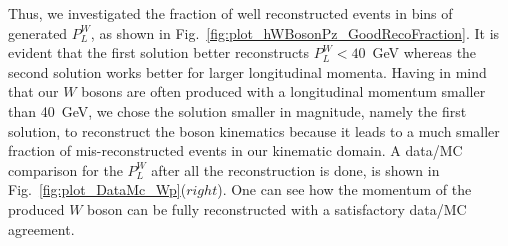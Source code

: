 \documentclass[12pt]{article}
\begin{document}
Thus, we investigated the fraction of well reconstructed events in bins of  generated $P^{W}_{L}$, as shown in Fig.~\ref{fig:plot_hWBosonPz_GoodRecoFraction}.
It is evident that the first solution better reconstructs  $P^{W}_{L}<40$~GeV whereas the second solution works better for larger longitudinal momenta.  
Having in mind that our $W$ bosons are often produced with a longitudinal momentum smaller than 40~GeV, we chose the solution smaller in magnitude, namely the first solution, to reconstruct the boson kinematics because it leads to a much smaller fraction of mis-reconstructed events in our kinematic domain. A data/MC comparison for the $P^{W}_{L}$ after all the reconstruction is done, is shown in Fig.~\ref{fig:plot_DataMc_Wp}($right$). One can see how the momentum of the produced $W$ boson can be fully reconstructed with a satisfactory data/MC agreement. 
 
\end{document}
